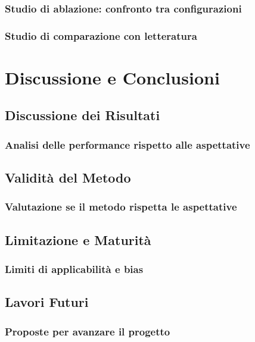 \documentclass[12pt,a4paper,twoside]{article}
\begin{document}
\subsubsection*{Studio di ablazione: confronto tra configurazioni}
\subsubsection*{Studio di comparazione con letteratura}


\newpage
\section{Discussione e Conclusioni}

\subsection*{Discussione dei Risultati}
\subsubsection*{Analisi delle performance rispetto alle aspettative}

\subsection*{Validità del Metodo}
\subsubsection*{Valutazione se il metodo rispetta le aspettative}

\subsection*{Limitazione e Maturità}
\subsubsection*{Limiti di applicabilità e bias}

\subsection*{Lavori Futuri}
\subsubsection*{Proposte per avanzare il progetto}
\end{document}
